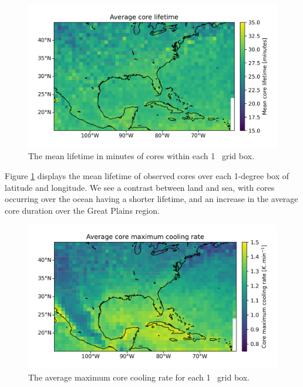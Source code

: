 \begin{figure}[tp]
    \centering
    \includegraphics[width=\textwidth]{figures/chapter2_06.png}
    \caption[
    The mean lifetime in minutes of cores
    ]{
    The mean lifetime in minutes of cores within each 1
    \textdegree\ grid box.
    }
    \label{fig:core_lifetime_map}
\end{figure}

Figure \ref{fig:core_lifetime_map} displays the mean lifetime of observed cores over each 1-degree box of latitude and longitude.
We see a contrast between land and sea, with cores occurring over the ocean having a shorter lifetime, and an increase in the average core duration over the Great Plains region.

\begin{figure}[tp]
    \centering
    \includegraphics[width=\textwidth]{figures/chapter2_07.png}
    \caption[
    The average maximum core cooling rate
    ]{
    The average maximum core cooling rate for each 1
    \textdegree\ grid box.
    }
    \label{fig:core_cooling_rate_map}
\end{figure}

